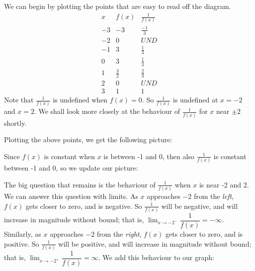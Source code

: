 \begin{solution}
We can begin by plotting the points that are easy to read off the diagram.
\[
\begin{array}{c|c|c}
x&f(x)&\frac{1}{f(x)}\\
\hline
-3&-3&\frac{-1}{3}\\
-2&0&UND\\
-1&3&\frac{1}{3}\\
0&3&\frac{1}{3}\\
1&\frac{3}{2}&\frac{2}{3}\\
2&0&UND\\
3&1&1
\end{array}
\]
Note that $\frac{1}{f(x)}$ is undefined when $f(x) = 0$.
        So $\frac{1}{f(x)}$ is undefined at $x=-2$ and $x=2$.
        We shall look more closely at the behaviour of $\frac{1}{f(x)}$
        for $x$ near $\pm 2$ shortly.

        Plotting the above points, we get the following picture:
\begin{center}
\end{center}

Since $f(x)$ is constant when $x$ is between -1 and 0, then also $\frac{1}{f(x)}$ is constant between -1 and 0, so we update our picture:

\begin{center}
\end{center}

The big question that remains is the behaviour of $\frac{1}{f(x)}$ when $x$ is near -2 and 2. We can answer this question with limits. As $x$ approaches $-2$ from the \emph{left}, $f(x)$ gets closer to zero, and is negative. So $\frac{1}{f(x)}$ will be negative, and will increase in magnitude without bound; that is, $\displaystyle\lim_{x \rightarrow -2^-}\dfrac{1}{f(x)}=-\infty$. Similarly, as
$x$ approaches $-2$ from the \emph{right}, $f(x)$ gets closer to zero, and is positive. So $\frac{1}{f(x)}$ will be positive, and will increase in magnitude without bound; that is, $\displaystyle\lim_{x \rightarrow -2^+}\dfrac{1}{f(x)}=\infty$. We add this behaviour to our graph:


\end{solution}

